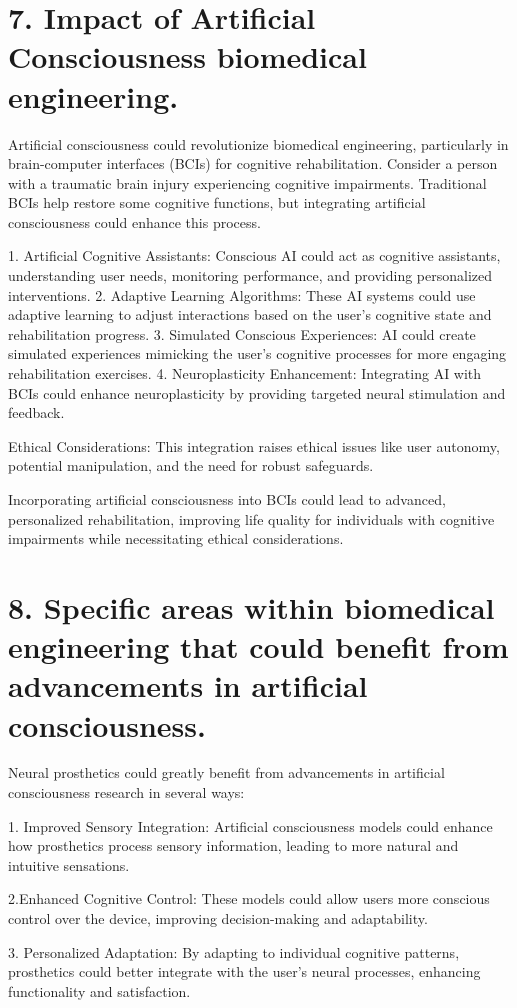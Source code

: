 \documentclass{article}
\begin{document}
\section*{7. Impact of Artificial Consciousness biomedical engineering.}
Artificial consciousness could revolutionize biomedical engineering, particularly in brain-computer interfaces (BCIs) for cognitive rehabilitation. Consider a person with a traumatic brain injury experiencing cognitive impairments. Traditional BCIs help restore some cognitive functions, but integrating artificial consciousness could enhance this process.

1. Artificial Cognitive Assistants: Conscious AI could act as cognitive assistants, understanding user needs, monitoring performance, and providing personalized interventions.
2. Adaptive Learning Algorithms: These AI systems could use adaptive learning to adjust interactions based on the user's cognitive state and rehabilitation progress.
3. Simulated Conscious Experiences: AI could create simulated experiences mimicking the user's cognitive processes for more engaging rehabilitation exercises.
4. Neuroplasticity Enhancement: Integrating AI with BCIs could enhance neuroplasticity by providing targeted neural stimulation and feedback.

Ethical Considerations: This integration raises ethical issues like user autonomy, potential manipulation, and the need for robust safeguards.

Incorporating artificial consciousness into BCIs could lead to advanced, personalized rehabilitation, improving life quality for individuals with cognitive impairments while necessitating ethical considerations.

\section*{8. Specific areas within biomedical engineering that could benefit from advancements in artificial consciousness.}
Neural prosthetics could greatly benefit from advancements in artificial consciousness research in several ways:

1. Improved Sensory Integration: Artificial consciousness models could enhance how prosthetics process sensory information, leading to more natural and intuitive sensations.

2.Enhanced Cognitive Control: These models could allow users more conscious control over the device, improving decision-making and adaptability.

3. Personalized Adaptation: By adapting to individual cognitive patterns, prosthetics could better integrate with the user’s neural processes, enhancing functionality and satisfaction.
\end{document}

